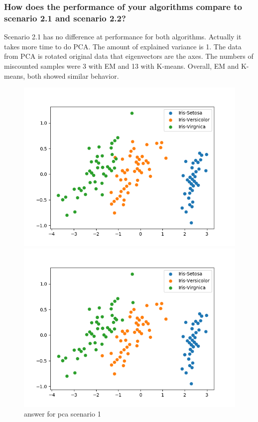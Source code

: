 \documentclass[a4paper]{article}
\begin{document}
        \subsubsection{How does the performance of your algorithms compare to scenario 2.1 and scenario 2.2?}

          Scenario 2.1 has no difference at performance for both algorithms. Actually it takes more time to do PCA.
          The amount of explained variance is 1. The data from PCA is rotated original data that eigenvectors are the axes.
          The numbers of miscounted samples were 3 with EM and 13 with K-means. Overall, EM and K-means, both showed similar behavior.

          \begin{figure}[h!]
            \centering
            \begin{minipage}[t]{6.5cm}
              \includegraphics[width=1.0\textwidth]{pca_em_1_ans.png}
              \caption{answer for pca scenario 1}
            \end{minipage}
            \hspace{2cm}
            \begin{minipage}[t]{6.5cm}
              \includegraphics[width=1.0\textwidth]{pca_em_1_1.png}

\end{minipage}
\end{figure}
\end{document}
